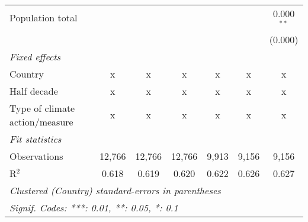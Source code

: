 \begin{tabular}{lcccccc}
   Population total                                               &              &                &                &                &                & 0.000$^{**}$\\   
                                                                  &              &                &                &                &                & (0.000)\\   
   \emph{Fixed effects}\\
   Country                                                        & x            & x              & x              & x              & x              & x\\  
   Half decade                                                    & x            & x              & x              & x              & x              & x\\  
   Type of climate action/measure                                 & x            & x              & x              & x              & x              & x\\  
   \midrule \emph{Fit statistics}\\
   Observations                                                   & 12,766       & 12,766         & 12,766         & 9,913          & 9,156          & 9,156\\  
   R$^2$                                                          & 0.618        & 0.619          & 0.620          & 0.622          & 0.626          & 0.627\\  
   \midrule
   \multicolumn{7}{l}{\emph{Clustered (Country) standard-errors in parentheses}}\\
   \multicolumn{7}{l}{\emph{Signif. Codes: ***: 0.01, **: 0.05, *: 0.1}}\\
\end{tabular}
\par\endgroup


